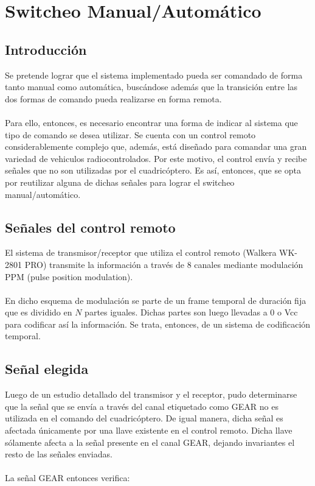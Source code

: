 \documentclass[main]{subfiles}
\begin{document}
\chapter{Switcheo Manual/Automático}

\section{Introducción}

Se pretende lograr que el sistema implementado pueda ser comandado de forma tanto manual como automática, buscándose además que la transición entre las dos formas de comando pueda realizarse en forma remota.\\
\\
Para ello, entonces, es necesario encontrar una forma de indicar al sistema que tipo de comando se desea utilizar. Se cuenta con un control remoto considerablemente complejo que, además, está diseñado para comandar una gran variedad de vehiculos radiocontrolados. Por este motivo, el control envía y recibe señales que no son utilizadas por el cuadricóptero. Es así, entonces, que se opta por reutilizar alguna de dichas señales para lograr el switcheo manual/automático.

\section{Señales del control remoto}

El sistema de transmisor/receptor que utiliza el control remoto (Walkera WK-2801 PRO) transmite la información a través de 8 canales mediante modulación PPM (pulse position modulation).\\
\\
En dicho esquema de modulación se parte de un frame temporal de duración fija que es dividido en $N$ partes iguales. Dichas partes son luego llevadas a 0 o Vcc para codificar así la información. Se trata, entonces, de un sistema de codificación temporal.\\

\section{Señal elegida}
Luego de un estudio detallado del transmisor y el receptor, pudo determinarse que la señal que se envía a través del canal etiquetado como GEAR no es utilizada en el comando del cuadricóptero. De igual manera, dicha señal es afectada únicamente por una llave existente en el control remoto. Dicha llave sólamente afecta a la señal presente en el canal GEAR, dejando invariantes el resto de las señales enviadas.\\
\\
La señal GEAR entonces verifica:
\end{document}
